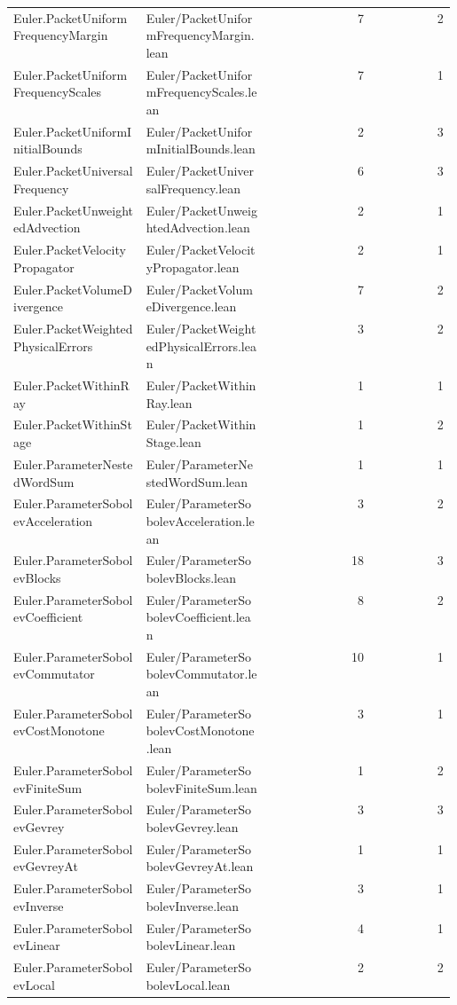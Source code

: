 \begin{longtable}{p{0.30\linewidth}p{0.28\linewidth}rr}
Euler.PacketUniformFrequencyMargin & Euler/PacketUniformFrequencyMargin.lean & 7 & 2\\
Euler.PacketUniformFrequencyScales & Euler/PacketUniformFrequencyScales.lean & 7 & 1\\
Euler.PacketUniformInitialBounds & Euler/PacketUniformInitialBounds.lean & 2 & 3\\
Euler.PacketUniversalFrequency & Euler/PacketUniversalFrequency.lean & 6 & 3\\
Euler.PacketUnweightedAdvection & Euler/PacketUnweightedAdvection.lean & 2 & 1\\
Euler.PacketVelocityPropagator & Euler/PacketVelocityPropagator.lean & 2 & 1\\
Euler.PacketVolumeDivergence & Euler/PacketVolumeDivergence.lean & 7 & 2\\
Euler.PacketWeightedPhysicalErrors & Euler/PacketWeightedPhysicalErrors.lean & 3 & 2\\
Euler.PacketWithinRay & Euler/PacketWithinRay.lean & 1 & 1\\
Euler.PacketWithinStage & Euler/PacketWithinStage.lean & 1 & 2\\
Euler.ParameterNestedWordSum & Euler/ParameterNestedWordSum.lean & 1 & 1\\
Euler.ParameterSobolevAcceleration & Euler/ParameterSobolevAcceleration.lean & 3 & 2\\
Euler.ParameterSobolevBlocks & Euler/ParameterSobolevBlocks.lean & 18 & 3\\
Euler.ParameterSobolevCoefficient & Euler/ParameterSobolevCoefficient.lean & 8 & 2\\
Euler.ParameterSobolevCommutator & Euler/ParameterSobolevCommutator.lean & 10 & 1\\
Euler.ParameterSobolevCostMonotone & Euler/ParameterSobolevCostMonotone.lean & 3 & 1\\
Euler.ParameterSobolevFiniteSum & Euler/ParameterSobolevFiniteSum.lean & 1 & 2\\
Euler.ParameterSobolevGevrey & Euler/ParameterSobolevGevrey.lean & 3 & 3\\
Euler.ParameterSobolevGevreyAt & Euler/ParameterSobolevGevreyAt.lean & 1 & 1\\
Euler.ParameterSobolevInverse & Euler/ParameterSobolevInverse.lean & 3 & 1\\
Euler.ParameterSobolevLinear & Euler/ParameterSobolevLinear.lean & 4 & 1\\
Euler.ParameterSobolevLocal & Euler/ParameterSobolevLocal.lean & 2 & 2\\

\end{longtable}
